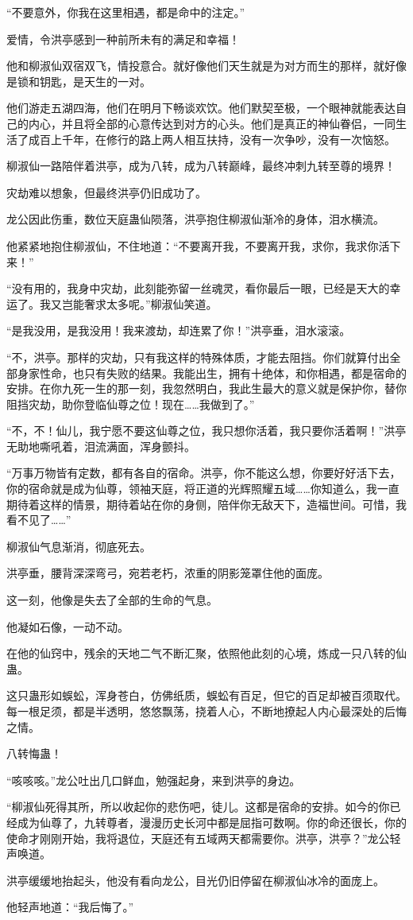 \begin{this_body}
“不要意外，你我在这里相遇，都是命中的注定。”

爱情，令洪亭感到一种前所未有的满足和幸福！

他和柳淑仙双宿双飞，情投意合。就好像他们天生就是为对方而生的那样，就好像是锁和钥匙，是天生的一对。

他们游走五湖四海，他们在明月下畅谈欢饮。他们默契至极，一个眼神就能表达自己的内心，并且将全部的心意传达到对方的心头。他们是真正的神仙眷侣，一同生活了成百上千年，在修行的路上两人相互扶持，没有一次争吵，没有一次恼怒。

柳淑仙一路陪伴着洪亭，成为八转，成为八转巅峰，最终冲刺九转至尊的境界！

灾劫难以想象，但最终洪亭仍旧成功了。

龙公因此伤重，数位天庭蛊仙陨落，洪亭抱住柳淑仙渐冷的身体，泪水横流。

他紧紧地抱住柳淑仙，不住地道：“不要离开我，不要离开我，求你，我求你活下来！”

“没有用的，我身中灾劫，此刻能弥留一丝魂灵，看你最后一眼，已经是天大的幸运了。我又岂能奢求太多呢。”柳淑仙笑道。

“是我没用，是我没用！我来渡劫，却连累了你！”洪亭垂，泪水滚滚。

“不，洪亭。那样的灾劫，只有我这样的特殊体质，才能去阻挡。你们就算付出全部身家性命，也只有失败的结果。我能出生，拥有十绝体，和你相遇，都是宿命的安排。在你九死一生的那一刻，我忽然明白，我此生最大的意义就是保护你，替你阻挡灾劫，助你登临仙尊之位！现在……我做到了。”

“不，不！仙儿，我宁愿不要这仙尊之位，我只想你活着，我只要你活着啊！”洪亭无助地嘶吼着，泪流满面，浑身颤抖。

“万事万物皆有定数，都有各自的宿命。洪亭，你不能这么想，你要好好活下去，你的宿命就是成为仙尊，领袖天庭，将正道的光辉照耀五域……你知道么，我一直期待着这样的情景，期待着站在你的身侧，陪伴你无敌天下，造福世间。可惜，我看不见了……”

柳淑仙气息渐消，彻底死去。

洪亭垂，腰背深深弯弓，宛若老朽，浓重的阴影笼罩住他的面庞。

这一刻，他像是失去了全部的生命的气息。

他凝如石像，一动不动。

在他的仙窍中，残余的天地二气不断汇聚，依照他此刻的心境，炼成一只八转的仙蛊。

这只蛊形如蜈蚣，浑身苍白，仿佛纸质，蜈蚣有百足，但它的百足却被百须取代。每一根足须，都是半透明，悠悠飘荡，挠着人心，不断地撩起人内心最深处的后悔之情。

八转悔蛊！

“咳咳咳。”龙公吐出几口鲜血，勉强起身，来到洪亭的身边。

“柳淑仙死得其所，所以收起你的悲伤吧，徒儿。这都是宿命的安排。如今的你已经成为仙尊了，九转尊者，漫漫历史长河中都是屈指可数啊。你的命还很长，你的使命才刚刚开始，我将退位，天庭还有五域两天都需要你。洪亭，洪亭？”龙公轻声唤道。

洪亭缓缓地抬起头，他没有看向龙公，目光仍旧停留在柳淑仙冰冷的面庞上。

他轻声地道：“我后悔了。”

\end{this_body}

